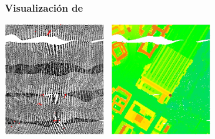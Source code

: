 \begin{frame}
 \frametitle{Visualización de \LARGE{}}
 \begin{center}
 \includegraphics[height=50mm]{images/voutlier_last}~
 \includegraphics[height=50mm]{images/routlier_last}
 \end{center}
\end{frame}
